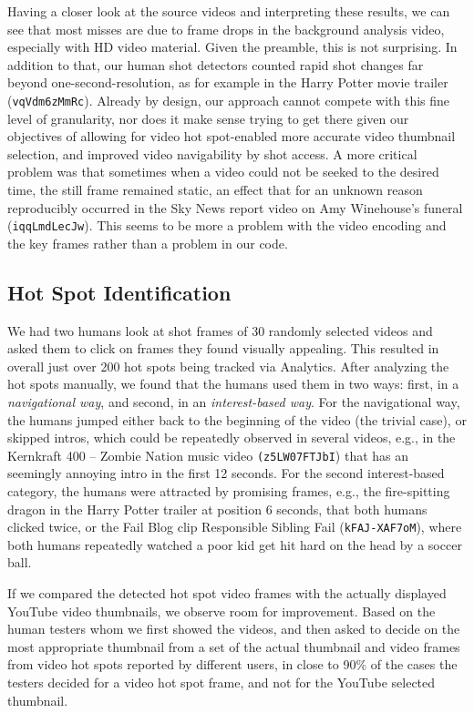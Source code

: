 \documentclass{acm_proc_article-sp}
\begin{document}
Having a closer look at the source videos and interpreting these results, we can see that most misses are due to frame drops in the background analysis video, especially with HD video material. Given the preamble, this is not surprising. In addition to that, our human shot detectors counted rapid shot changes far beyond one-second-resolution, as for example in the Harry Potter movie trailer (\texttt{vqVdm6zMmRc}). Already by design, our approach cannot compete with this fine level of granularity, nor does it make sense trying to get there given our objectives of allowing for video hot spot-enabled more accurate video thumbnail selection, and improved video navigability by shot access. A more critical problem was that sometimes when a video could not be seeked to the desired time, the still frame remained static, an effect that for an unknown reason reproducibly occurred in the Sky News report video on Amy Winehouse's funeral (\texttt{iqqLmdLecJw}). This seems to be more a problem with the video encoding and the key frames rather than a problem in our code. 

\subsection{Hot Spot Identification}
We had two humans look at shot frames of 30 randomly selected videos and asked them to click on frames they found visually appealing. This resulted in overall just over 200 hot spots being tracked via Analytics. After analyzing the hot spots manually, we found that the humans used them in two ways: first, in a \emph{navigational way}, and second, in an \emph{interest-based way}. For the navigational way, the humans jumped either back to the beginning of the video (the trivial case), or skipped intros, which could be repeatedly observed in several videos, e.g., in the Kernkraft 400 -- Zombie Nation music video \texttt{(z5LW07FTJbI}) that has an seemingly annoying intro in the first 12 seconds. For the second interest-based category, the humans were attracted by promising frames, e.g., the fire-spitting dragon in the Harry Potter trailer at position 6 seconds, that both humans clicked twice, or the Fail Blog clip Responsible Sibling Fail (\texttt{kFAJ-XAF7oM}), where both humans repeatedly watched a poor kid get hit hard on the head by a soccer ball.

If we compared the detected hot spot video frames with the actually displayed YouTube video thumbnails, we observe room for improvement. Based on the human testers whom we first showed the videos, and then asked to decide on the most appropriate thumbnail from a set of the actual thumbnail and video frames from video hot spots reported by different users, in close to 90\% of the cases the testers decided for a video hot spot frame, and not for the YouTube selected thumbnail. 
\end{document}
